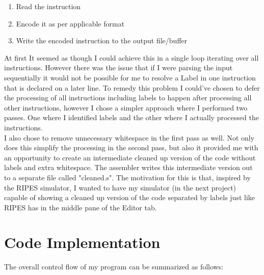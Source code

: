 \documentclass[12pt]{article}
\begin{document}
    \begin{enumerate}
		\item{Read the instruction}
		\item{Encode it as per applicable format}
		\item{Write the encoded instruction to the output file/buffer}
	\end{enumerate}

    At first It seemed as though I could achieve this in a single loop iterating over all instructions. However there was the issue that if I were parsing the input sequentially it would not be possible for me to resolve a Label in one instruction that is declared on a later line. To remedy this problem I could've chosen to defer the processing of all instructions including labels to happen after processing all other instructions, however I chose a simpler approach where I performed two passes. One where I identified labels and the other where I actually processed the instructions.
    \\

    I also chose to remove unnecessary whitespace in the first pass as well. Not only does this simplify the processing in the second pass, but also it provided me with an opportunity to create an intermediate cleaned up version of the code without labels and extra whitespace. The assembler writes this intermediate version out to a separate file called "cleaned.s". The motivation for this is that, inspired by the RIPES simulator, I wanted to have my simulator (in the next project) capable of showing a cleaned up version of the code separated by labels just like RIPES has in the middle pane of the Editor tab.

    \section{Code Implementation}

    The overall control flow of my program can be summarized as follows:
    \\\\
\end{document}
